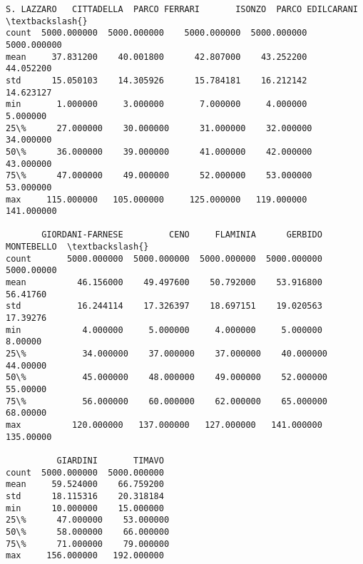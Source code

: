 \documentclass[11pt]{article}
\begin{document}
\begin{tcolorbox}[breakable, size=fbox, boxrule=.5pt, pad at break*=1mm, opacityfill=0]
\begin{Verbatim}[commandchars=\\\{\}]
        S. LAZZARO   CITTADELLA  PARCO FERRARI       ISONZO  PARCO EDILCARANI  \textbackslash{}
count  5000.000000  5000.000000    5000.000000  5000.000000       5000.000000
mean     37.831200    40.001800      42.807000    43.252200         44.052200
std      15.050103    14.305926      15.784181    16.212142         14.623127
min       1.000000     3.000000       7.000000     4.000000          5.000000
25\%      27.000000    30.000000      31.000000    32.000000         34.000000
50\%      36.000000    39.000000      41.000000    42.000000         43.000000
75\%      47.000000    49.000000      52.000000    53.000000         53.000000
max     115.000000   105.000000     125.000000   119.000000        141.000000

       GIORDANI-FARNESE         CENO     FLAMINIA      GERBIDO  MONTEBELLO  \textbackslash{}
count       5000.000000  5000.000000  5000.000000  5000.000000  5000.00000
mean          46.156000    49.497600    50.792000    53.916800    56.41760
std           16.244114    17.326397    18.697151    19.020563    17.39276
min            4.000000     5.000000     4.000000     5.000000     8.00000
25\%           34.000000    37.000000    37.000000    40.000000    44.00000
50\%           45.000000    48.000000    49.000000    52.000000    55.00000
75\%           56.000000    60.000000    62.000000    65.000000    68.00000
max          120.000000   137.000000   127.000000   141.000000   135.00000

          GIARDINI       TIMAVO
count  5000.000000  5000.000000
mean     59.524000    66.759200
std      18.115316    20.318184
min      10.000000    15.000000
25\%      47.000000    53.000000
50\%      58.000000    66.000000
75\%      71.000000    79.000000
max     156.000000   192.000000
\end{Verbatim}
\end{tcolorbox}
        
\end{document}
